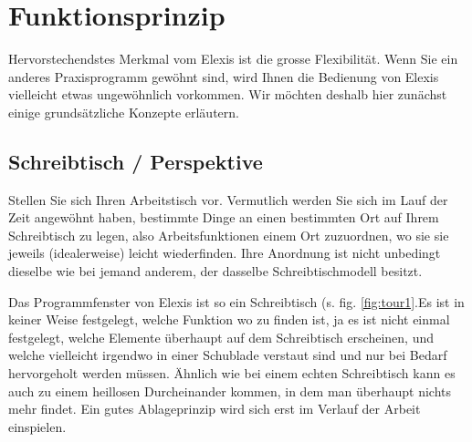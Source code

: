 
\section{Funktionsprinzip}
Hervorstechendstes Merkmal vom Elexis ist die grosse Flexibilität. Wenn Sie ein anderes Praxisprogramm gewöhnt sind, wird Ihnen die Bedienung von Elexis vielleicht etwas ungewöhnlich vorkommen. Wir möchten deshalb hier zunächst einige grundsätzliche Konzepte erläutern.

 \subsection{Schreibtisch / Perspektive}
Stellen Sie sich Ihren Arbeitstisch vor. Vermutlich werden Sie sich im Lauf der Zeit angewöhnt haben,
bestimmte Dinge an einen bestimmten Ort auf Ihrem Schreibtisch zu legen, also
Arbeitsfunktionen einem Ort zuzuordnen, wo sie sie jeweils (idealerweise) leicht wiederfinden. Ihre Anordnung ist nicht unbedingt dieselbe wie bei jemand anderem, der dasselbe Schreibtischmodell besitzt.

Das Programmfenster von Elexis ist so ein Schreibtisch (s. fig. \ref{fig:tour1}.Es ist in keiner Weise festgelegt, welche Funktion wo zu finden ist, ja es ist nicht einmal festgelegt, welche Elemente überhaupt auf dem Schreibtisch erscheinen, und welche vielleicht irgendwo in einer Schublade verstaut sind und nur bei Bedarf hervorgeholt werden müssen. Ähnlich wie bei einem echten Schreibtisch kann es auch zu einem heillosen Durcheinander kommen, in dem man überhaupt nichts mehr findet. Ein gutes Ablageprinzip wird sich erst im Verlauf der Arbeit einspielen.

